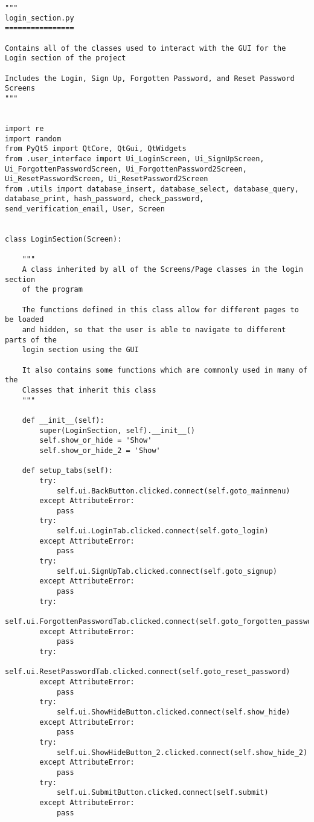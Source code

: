 \documentclass{article}
\begin{document}
\begin{lstlisting}
"""
login_section.py
================

Contains all of the classes used to interact with the GUI for the
Login section of the project

Includes the Login, Sign Up, Forgotten Password, and Reset Password Screens
"""


import re
import random
from PyQt5 import QtCore, QtGui, QtWidgets
from .user_interface import Ui_LoginScreen, Ui_SignUpScreen, Ui_ForgottenPasswordScreen, Ui_ForgottenPassword2Screen, Ui_ResetPasswordScreen, Ui_ResetPassword2Screen
from .utils import database_insert, database_select, database_query, database_print, hash_password, check_password, send_verification_email, User, Screen


class LoginSection(Screen):

    """
    A class inherited by all of the Screens/Page classes in the login section
    of the program

    The functions defined in this class allow for different pages to be loaded
    and hidden, so that the user is able to navigate to different parts of the
    login section using the GUI

    It also contains some functions which are commonly used in many of the
    Classes that inherit this class
    """

    def __init__(self):
        super(LoginSection, self).__init__()
        self.show_or_hide = 'Show'
        self.show_or_hide_2 = 'Show'

    def setup_tabs(self):
        try:
            self.ui.BackButton.clicked.connect(self.goto_mainmenu)
        except AttributeError:
            pass
        try:
            self.ui.LoginTab.clicked.connect(self.goto_login)
        except AttributeError:
            pass
        try:
            self.ui.SignUpTab.clicked.connect(self.goto_signup)
        except AttributeError:
            pass
        try:
            self.ui.ForgottenPasswordTab.clicked.connect(self.goto_forgotten_password)
        except AttributeError:
            pass
        try:
            self.ui.ResetPasswordTab.clicked.connect(self.goto_reset_password)
        except AttributeError:
            pass
        try:
            self.ui.ShowHideButton.clicked.connect(self.show_hide)
        except AttributeError:
            pass
        try:
            self.ui.ShowHideButton_2.clicked.connect(self.show_hide_2)
        except AttributeError:
            pass
        try:
            self.ui.SubmitButton.clicked.connect(self.submit)
        except AttributeError:
            pass


\end{lstlisting}
\end{document}
